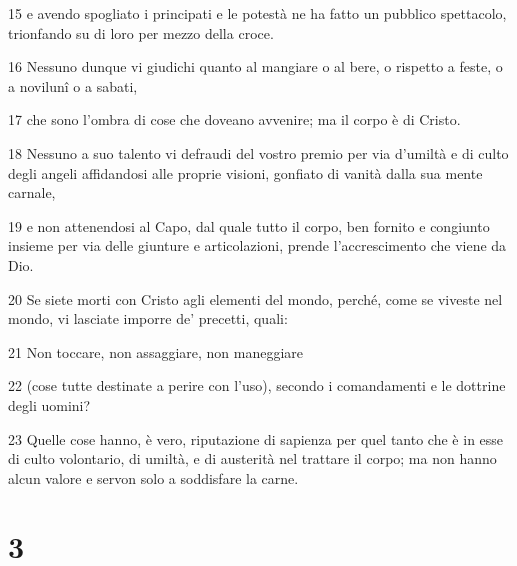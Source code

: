 \par 15 e avendo spogliato i principati e le potestà ne ha fatto un pubblico spettacolo, trionfando su di loro per mezzo della croce.
\par 16 Nessuno dunque vi giudichi quanto al mangiare o al bere, o rispetto a feste, o a novilunî o a sabati,
\par 17 che sono l'ombra di cose che doveano avvenire; ma il corpo è di Cristo.
\par 18 Nessuno a suo talento vi defraudi del vostro premio per via d'umiltà e di culto degli angeli affidandosi alle proprie visioni, gonfiato di vanità dalla sua mente carnale,
\par 19 e non attenendosi al Capo, dal quale tutto il corpo, ben fornito e congiunto insieme per via delle giunture e articolazioni, prende l'accrescimento che viene da Dio.
\par 20 Se siete morti con Cristo agli elementi del mondo, perché, come se viveste nel mondo, vi lasciate imporre de' precetti, quali:
\par 21 Non toccare, non assaggiare, non maneggiare
\par 22 (cose tutte destinate a perire con l'uso), secondo i comandamenti e le dottrine degli uomini?
\par 23 Quelle cose hanno, è vero, riputazione di sapienza per quel tanto che è in esse di culto volontario, di umiltà, e di austerità nel trattare il corpo; ma non hanno alcun valore e servon solo a soddisfare la carne.

\chapter{3}

